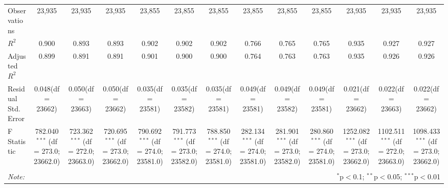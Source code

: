 \begin{table}[!htbp]
\begin{tabular}{@{\extracolsep{5pt}}lcccccccccccc}
 Observations & 23,935 & 23,935 & 23,935 & 23,855 & 23,855 & 23,855 & 23,855 & 23,855 & 23,855 & 23,935 & 23,935 & 23,935 \\
 $R^2$ & 0.900 & 0.893 & 0.893 & 0.902 & 0.902 & 0.902 & 0.766 & 0.765 & 0.765 & 0.935 & 0.927 & 0.927 \\
 Adjusted $R^2$ & 0.899 & 0.891 & 0.891 & 0.901 & 0.900 & 0.900 & 0.764 & 0.763 & 0.763 & 0.935 & 0.926 & 0.926 \\
 Residual Std. Error & 0.048(df = 23662) & 0.050(df = 23663) & 0.050(df = 23662) & 0.035(df = 23581) & 0.035(df = 23582) & 0.035(df = 23581) & 0.049(df = 23581) & 0.049(df = 23582) & 0.049(df = 23581) & 0.021(df = 23662) & 0.022(df = 23663) & 0.022(df = 23662)  \\
 F Statistic & 782.040$^{***}$ (df = 273.0; 23662.0) & 723.362$^{***}$ (df = 272.0; 23663.0) & 720.695$^{***}$ (df = 273.0; 23662.0) & 790.692$^{***}$ (df = 274.0; 23581.0) & 791.773$^{***}$ (df = 273.0; 23582.0) & 788.850$^{***}$ (df = 274.0; 23581.0) & 282.134$^{***}$ (df = 274.0; 23581.0) & 281.901$^{***}$ (df = 273.0; 23582.0) & 280.860$^{***}$ (df = 274.0; 23581.0) & 1252.082$^{***}$ (df = 273.0; 23662.0) & 1102.511$^{***}$ (df = 272.0; 23663.0) & 1098.433$^{***}$ (df = 273.0; 23662.0) \\
\hline
\hline \\[-1.8ex]
\textit{Note:} & \multicolumn{12}{r}{$^{*}$p$<$0.1; $^{**}$p$<$0.05; $^{***}$p$<$0.01} \\
\end{tabular}
\end{table}